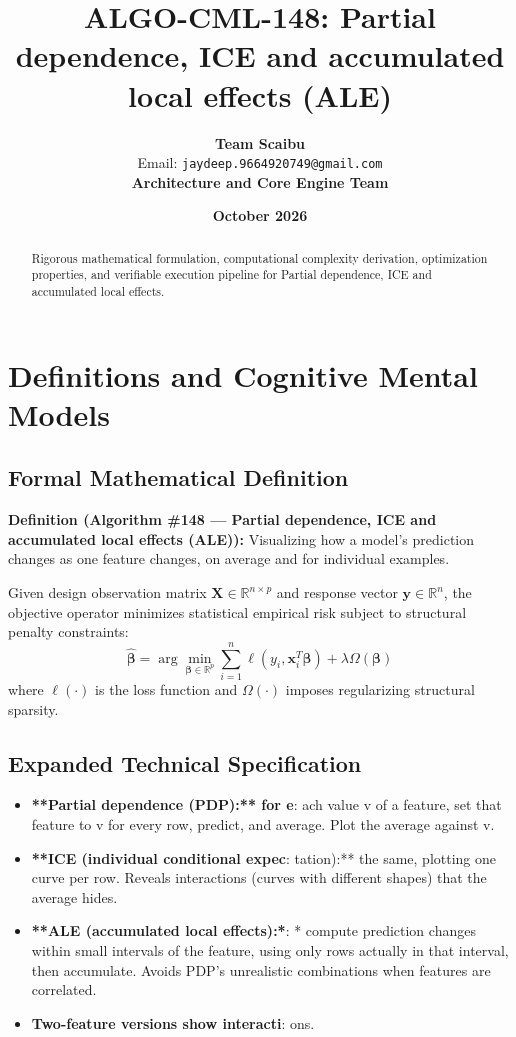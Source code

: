 \documentclass[11pt,a4paper]{article}
\title{\textbf{ALGO-CML-148: Partial dependence, ICE and accumulated local effects (ALE)}}
\author{\textbf{Team Scaibu} \\ \small Email: \texttt{jaydeep.9664920749@gmail.com} \\ \small \textbf{Architecture and Core Engine Team}}
\date{\textbf{October 2026}}
\theoremstyle{definition}
\begin{document}
\maketitle

\begin{abstract}
Rigorous mathematical formulation, computational complexity derivation, optimization properties, and verifiable execution pipeline for Partial dependence, ICE and accumulated local effects.
\end{abstract}

\section{Definitions and Cognitive Mental Models}

\subsection{Formal Mathematical Definition}
\textbf{Definition (Algorithm \#148 --- Partial dependence, ICE and accumulated local effects (ALE)):}
Visualizing how a model's prediction changes as one feature changes, on average and for individual examples.

Given design observation matrix $\mathbf{X} \in \mathbb{R}^{n \times p}$ and response vector $\mathbf{y} \in \mathbb{R}^n$, the objective operator minimizes statistical empirical risk subject to structural penalty constraints:
\begin{equation}
\hat{\boldsymbol{\beta}} = \arg\min_{\boldsymbol{\beta} \in \mathbb{R}^p} \sum_{i=1}^n \ell(y_i, \mathbf{x}_i^T \boldsymbol{\beta}) + \lambda \Omega(\boldsymbol{\beta})
\end{equation}
where $\ell(\cdot)$ is the loss function and $\Omega(\cdot)$ imposes regularizing structural sparsity.

\subsection{Expanded Technical Specification}
\begin{itemize}
\item \textbf{**Partial dependence (PDP):** for e}: ach value v of a feature, set that feature to v for every row, predict, and average. Plot the average against v.
\item \textbf{**ICE (individual conditional expec}: tation):** the same, plotting one curve per row. Reveals interactions (curves with different shapes) that the average hides.
\item \textbf{**ALE (accumulated local effects):*}: * compute prediction changes within small intervals of the feature, using only rows actually in that interval, then accumulate. Avoids PDP's unrealistic combinations when features are correlated.
\item \textbf{Two-feature versions show interacti}: ons.
\end{itemize}
\end{document}

